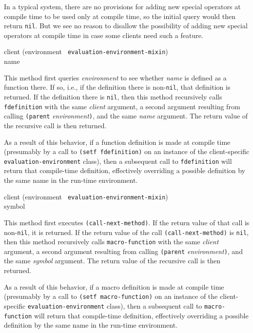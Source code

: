 In a typical system, there are no provisions for adding new special
operators at compile time to be used only at compile time, so the
initial query would then return \texttt{nil}.  But we see no reason to
disallow the possibility of adding new special operators at compile
time in case some clients need such a feature.

{\small{} {client (environment {\tt
      evaluation-environment-mixin}) \\ name}
}

This method first queries \textit{environment} to see whether
\textit{name} is defined as a function there.  If so, i.e., if the
definition there is non-\texttt{nil}, that definition is returned.  If
the definition there is \texttt{nil}, then this method recursively
calls \texttt{fdefinition} with the same \textit{client} argument, a
second argument resulting from calling \texttt{(parent}
\textit{environment}\texttt{)}, and the same \textit{name} argument.
The return value of the recursive call is then returned.

As a result of this behavior, if a function definition is made at
compile time (presumably by a call to \texttt{(setf fdefinition)} on
an instance of the client-specific \texttt{evaluation-environment}
class), then a subsequent call to \texttt{fdefinition} will return
that compile-time definition, effectively overriding a possible
definition by the same name in the run-time environment.

{\small{} {client (environment {\tt
      evaluation-environment-mixin}) \\ symbol}
}

This method first executes \texttt{(call-next-method)}.  If the return
value of that call is non-\texttt{nil}, it is returned.  If the return
value of the call \texttt{(call-next-method)} is \texttt{nil}, then
this method recursively calls \texttt{macro-function} with the same
\textit{client} argument, a second argument resulting from calling
\texttt{(parent} \textit{environment}\texttt{)}, and the same
\textit{symbol} argument.  The return value of the recursive
call is then returned.

As a result of this behavior, if a macro definition is made at compile
time (presumably by a call to \texttt{(setf macro-function)} on an
instance of the client-specific \texttt{evaluation-environment}
class), then a subsequent call to \texttt{macro-function} will return
that compile-time definition, effectively overriding a possible
definition by the same name in the run-time environment.


